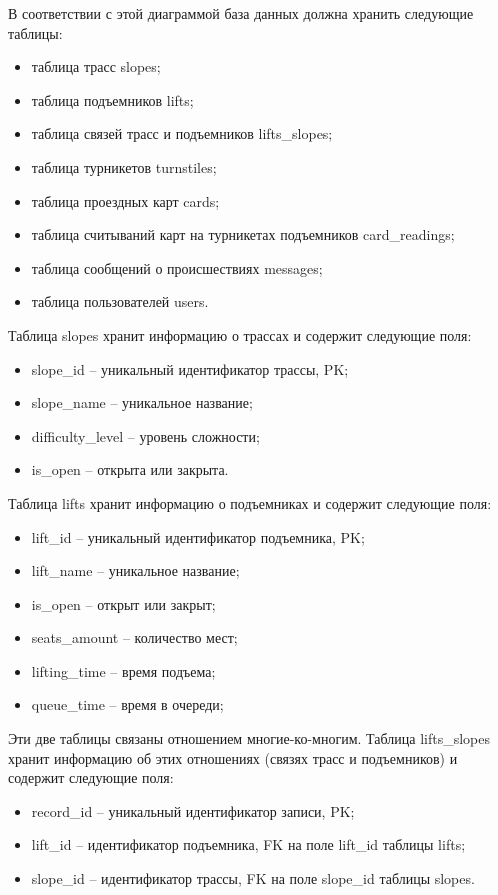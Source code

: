 В соответствии с этой диаграммой база данных должна хранить следующие таблицы:  


\begin{itemize}
	\item таблица трасс slopes;
	\item таблица подъемников lifts;
	\item таблица связей трасс и подъемников lifts\_slopes;
	\item таблица турникетов turnstiles;
	\item таблица проездных карт cards;
	\item таблица считываний карт на турникетах подъемников card\_readings;
	\item таблица сообщений о происшествиях messages;
	\item таблица пользователей users.
\end{itemize}


Таблица slopes хранит информацию о трассах и содержит следующие поля:
\begin{itemize}
	\item slope\_id -- уникальный идентификатор трассы, PK;
	\item slope\_name -- уникальное название;
	\item difficulty\_level -- уровень сложности;
	\item is\_open -- открыта или закрыта.
\end{itemize}


Таблица lifts хранит информацию о подъемниках и содержит следующие поля:
\begin{itemize}
	\item lift\_id -- уникальный идентификатор подъемника, PK;
	\item lift\_name -- уникальное название;
	\item is\_open -- открыт или закрыт;
	\item seats\_amount -- количество мест;
	\item lifting\_time -- время подъема;
	\item queue\_time -- время в очереди;
\end{itemize}


Эти две таблицы связаны отношением многие-ко-многим. Таблица lifts\_slopes хранит информацию об этих отношениях (связях трасс и подъемников) и содержит следующие поля:
\begin{itemize}
	\item record\_id -- уникальный идентификатор записи, PK;
	\item lift\_id -- идентификатор подъемника, FK на поле lift\_id таблицы lifts;
	\item slope\_id -- идентификатор трассы, FK на поле slope\_id таблицы slopes.
\end{itemize}


